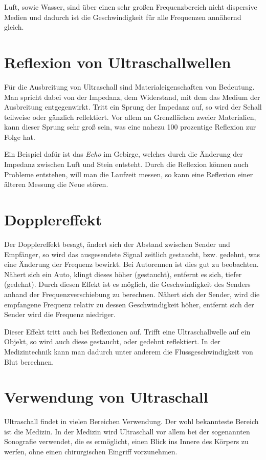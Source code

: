 Luft, sowie Wasser, sind über einen sehr großen Frequenzbereich nicht dispersive Medien und dadurch ist die Geschwindigkeit für alle Frequenzen annähernd gleich.

\section{Reflexion von Ultraschallwellen}
Für die Ausbreitung von Ultraschall sind Materialeigenschaften von Bedeutung.
Man spricht dabei von der Impedanz, dem Widerstand, mit dem das Medium der Ausbreitung entgegenwirkt.
Tritt ein Sprung der Impedanz auf, so wird der Schall teilweise oder gänzlich reflektiert.
Vor allem an Grenzflächen zweier Materialien, kann dieser Sprung sehr groß sein, was eine nahezu 100 prozentige Reflexion zur Folge hat.

Ein Beispiel dafür ist das \emph{Echo} im Gebirge, welches durch die Änderung der Impedanz zwischen Luft und Stein entsteht. Durch die Reflexion können auch Probleme entstehen, will man die Laufzeit messen, so kann eine Reflexion einer älteren Messung die Neue stören.

\section{Dopplereffekt}
Der Dopplereffekt besagt, ändert sich der Abstand zwischen Sender und Empfänger, so wird das ausgesendete Signal zeitlich gestaucht, bzw. gedehnt, was eine Änderung der Frequenz bewirkt. Bei Autorennen ist dies gut zu beobachten. Nähert sich ein Auto, klingt dieses höher (gestaucht), entfernt es sich, tiefer (gedehnt). Durch diesen Effekt ist es möglich, die Geschwindigkeit des Senders anhand der Frequenzverschiebung zu berechnen. Nähert sich der Sender, wird die empfangene Frequenz relativ zu dessen Geschwindigkeit höher, entfernt sich der Sender wird die Frequenz niedriger.

Dieser Effekt tritt auch bei Reflexionen auf. Trifft eine Ultraschallwelle auf ein Objekt, so wird auch diese gestaucht, oder gedehnt reflektiert.
In der Medizintechnik kann man dadurch unter anderem die Flussgeschwindigkeit von Blut berechnen.

\section{Verwendung von Ultraschall}
Ultraschall findet in vielen Bereichen Verwendung. Der wohl bekannteste Bereich ist die Medizin. In der Medizin wird Ultraschall vor allem bei der sogenannten Sonografie verwendet, die es ermöglicht, einen Blick ins Innere des Körpers zu werfen, ohne einen chirurgischen Eingriff vorzunehmen.

